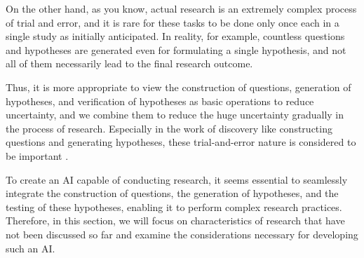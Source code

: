 On the other hand, as you know, actual research is an extremely complex process of trial and error, and it is rare for these tasks to be done only once each in a single study as initially anticipated. In reality, for example, countless questions and hypotheses are generated even for formulating a single hypothesis, and not all of them necessarily lead to the final research outcome. 

Thus, it is more appropriate to view the construction of questions, generation of hypotheses, and verification of hypotheses as basic operations to reduce uncertainty, and we combine them to reduce the huge uncertainty gradually in the process of research. Especially in the work of discovery like constructing questions and generating hypotheses, these trial-and-error nature is considered to be important \cite{yanai2020hypothesis}.

To create an AI capable of conducting research, it seems essential to seamlessly integrate the construction of questions, the generation of hypotheses, and the testing of these hypotheses, enabling it to perform complex research practices. Therefore, in this section, we will focus on characteristics of research that have not been discussed so far and examine the considerations necessary for developing such an AI.




